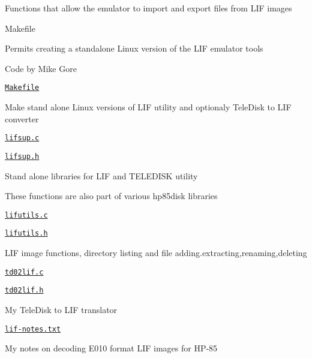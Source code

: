 \begin{DoxyItemize}
\begin{DoxyItemize}
\begin{DoxyItemize}
\item Functions that allow the emulator to import and export files from L\+IF images
\end{DoxyItemize}
\item Makefile
\begin{DoxyItemize}
\item Permits creating a standalone Linux version of the L\+IF emulator tools
\end{DoxyItemize}
\item Code by Mike Gore
\begin{DoxyItemize}
\item \href{lif/Makefile}{\tt Makefile}
\begin{DoxyItemize}
\item Make stand alone Linux versions of L\+IF utility and optionaly Tele\+Disk to L\+IF converter
\end{DoxyItemize}
\item \href{lif/lifsup.c}{\tt lifsup.\+c}
\item \href{lif/lifsup.h}{\tt lifsup.\+h}
\begin{DoxyItemize}
\item Stand alone libraries for L\+IF and T\+E\+L\+E\+D\+I\+SK utility
\begin{DoxyItemize}
\item These functions are also part of various hp85disk libraries
\end{DoxyItemize}
\end{DoxyItemize}
\item \href{lif/lifutils.c}{\tt lifutils.\+c}
\item \href{lif/lifutils.h}{\tt lifutils.\+h}
\begin{DoxyItemize}
\item L\+IF image functions, directory listing and file adding.\+extracting,renaming,deleting
\end{DoxyItemize}
\item \href{lif/td02lif.c}{\tt td02lif.\+c}
\item \href{lif/td02lif.h}{\tt td02lif.\+h}
\begin{DoxyItemize}
\item My Tele\+Disk to L\+IF translator
\end{DoxyItemize}
\item \href{lif/lif-notes.txt}{\tt lif-\/notes.\+txt}
\begin{DoxyItemize}
\item My notes on decoding E010 format L\+IF images for H\+P-\/85

\end{DoxyItemize}
\end{DoxyItemize}
\end{DoxyItemize}
\end{DoxyItemize}
